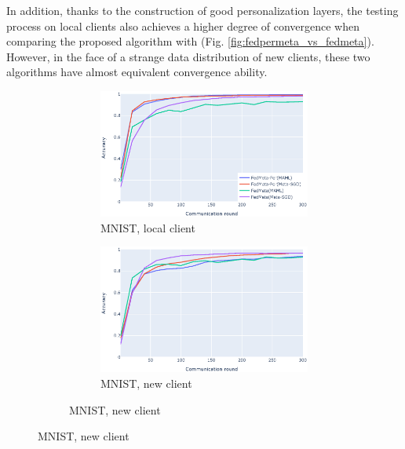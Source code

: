 \documentclass[runningheads]{llncs}
\begin{document}
In addition, thanks to the construction of good personalization layers, the testing process on local clients also achieves a higher degree of convergence when comparing the proposed algorithm with  (Fig. \ref{fig:fedpermeta_vs_fedmeta}). However, in the face of a strange data distribution of new clients, these two algorithms have almost equivalent convergence ability.

\begin{figure}[h]
    \centering
    \begin{subfigure}{\textwidth}
        \centering
        \begin{subfigure}{.49\textwidth}
            \includegraphics[width=\linewidth]{img/mnist_old_metaper.eps}
            \caption{MNIST, local client}\label{mnist_old_metaper}
        \end{subfigure}
        \begin{subfigure}{.49\textwidth}
            \includegraphics[width=\linewidth]{img/mnist_new_metaper.eps}
            \caption{MNIST, new client}\label{mnist_new_metaper}

\end{subfigure}
\end{subfigure}
\end{figure}
\end{document}
